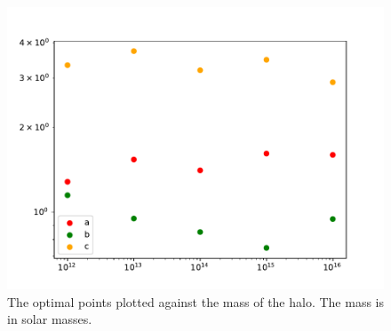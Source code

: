 \begin{figure}[!hb]
\vspace*{-0.5cm}
\centering
\includegraphics[scale=0.6]{plots/3b.pdf}
\caption{The optimal points plotted against the mass of the halo. The mass is in solar masses. }
\label{fig:bleh}
\end{figure}















